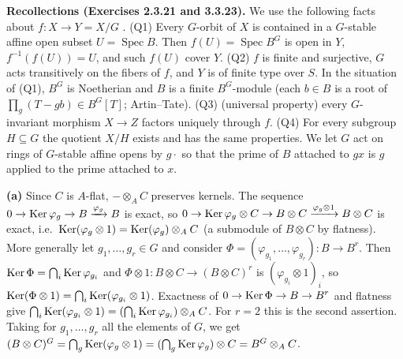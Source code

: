 \documentclass[11pt]{article}
\begin{document}
\pf
\textbf{Recollections (Exercises 2.3.21 and 3.3.23).} We use the following facts about $f:X\to Y=X/G$ .
(Q1) Every $G$-orbit of $X$ is contained in a $G$-stable affine open subset $U=\operatorname{Spec}B$. Then $f(U)=\operatorname{Spec}B^G$ is open in $Y$, $f^{-1}(f(U))=U$, and such $f(U)$ cover $Y$.
(Q2) $f$ is finite and surjective, $G$ acts transitively on the fibers of $f$, and $Y$ is of finite type over $S$. In the situation of (Q1), $B^G$ is Noetherian and $B$ is a finite $B^G$-module (each $b\in B$ is a root of $\prod_{g}(T-gb)\in B^G[T]$; Artin--Tate).
(Q3) (universal property) every $G$-invariant morphism $X\to Z$ factors uniquely through $f$.
(Q4) For every subgroup $H\subseteq G$ the quotient $X/H$ exists and has the same properties.
We let $G$ act on rings of $G$-stable affine opens by $g\cdot$ so that the prime of $B$ attached to $gx$ is $g$ applied to the prime attached to $x$.

\textbf{(a)} Since $C$ is $A$-flat, $-\otimes_AC$ preserves kernels. The sequence $0\to\operatorname{Ker}\varphi_g\to B\xrightarrow{\varphi_g}B$ is exact, so $0\to\operatorname{Ker}\varphi_g\otimes C\to B\otimes C\xrightarrow{\varphi_g\otimes1}B\otimes C$ is exact, i.e.\ $\operatorname{Ker}(\varphi_g\otimes1)=\operatorname{Ker}(\varphi_g)\otimes_AC$ (a submodule of $B\otimes C$ by flatness). More generally let $g_1,\dots,g_r\in G$ and consider $\Phi=(\varphi_{g_1},\dots,\varphi_{g_r}):B\to B^r$. Then $\operatorname{Ker}\Phi=\bigcap_i\operatorname{Ker}\varphi_{g_i}$ and $\Phi\otimes1:B\otimes C\to(B\otimes C)^r$ is $(\varphi_{g_i}\otimes1)_i$, so $\operatorname{Ker}(\Phi\otimes1)=\bigcap_i\operatorname{Ker}(\varphi_{g_i}\otimes1)$. Exactness of $0\to\operatorname{Ker}\Phi\to B\to B^r$ and flatness give $\bigcap_i\operatorname{Ker}(\varphi_{g_i}\otimes1)=(\bigcap_i\operatorname{Ker}\varphi_{g_i})\otimes_AC$. For $r=2$ this is the second assertion. Taking for $g_1,\dots,g_r$ all the elements of $G$, we get $(B\otimes C)^G=\bigcap_g\operatorname{Ker}(\varphi_g\otimes1)=(\bigcap_g\operatorname{Ker}\varphi_g)\otimes C=B^G\otimes_AC$.
\end{document}
